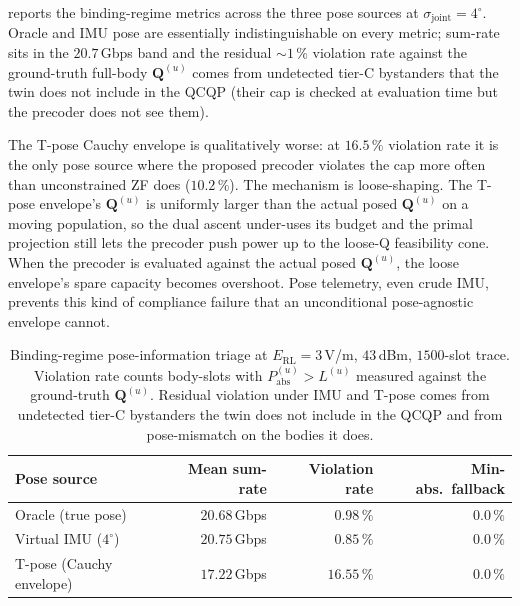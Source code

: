 \documentclass[journal,twocolumn,10pt]{IEEEtran}
\theoremstyle{plain}
\theoremstyle{remark}
\newcommand{\Pabs}{P_{\mathrm{abs}}}
\newcommand{\Qmat}{\mathbf{Q}}
\begin{document}
 reports the binding-regime metrics across the
three pose sources at $\sigma_{\mathrm{joint}} = 4^\circ$. Oracle
and IMU pose are essentially indistinguishable on every metric;
sum-rate sits in the $20.7\,$Gbps band and the residual
$\sim 1\,\%$ violation rate against the ground-truth full-body
$\Qmat^{(u)}$ comes from undetected tier-C bystanders that the
twin does not include in the QCQP (their cap is checked at
evaluation time but the precoder does not see them).

The T-pose Cauchy envelope is qualitatively worse: at
$16.5\,\%$ violation rate it is the only pose source where the
proposed precoder violates the cap more often than unconstrained
ZF does ($10.2\,\%$). The mechanism is loose-shaping. The T-pose
envelope's $\Qmat^{(u)}$ is uniformly larger than the actual posed
$\Qmat^{(u)}$ on a moving population, so the dual ascent under-uses
its budget and the primal projection still lets the precoder push
power up to the loose-Q feasibility cone. When the precoder is
evaluated against the actual posed $\Qmat^{(u)}$, the loose
envelope's spare capacity becomes overshoot. Pose telemetry, even
crude IMU, prevents this kind of compliance failure that an
unconditional pose-agnostic envelope cannot.

\begin{table}[!t]
\caption{Binding-regime pose-information triage at
$E_{\mathrm{RL}} = 3\,$V/m, $43\,$dBm, $1500$-slot trace. Violation
rate counts body-slots with $\Pabs^{(u)} > L^{(u)}$ measured against
the ground-truth $\Qmat^{(u)}$. Residual violation under IMU and
T-pose comes from undetected tier-C bystanders the twin does not
include in the QCQP and from pose-mismatch on the bodies it does.}
\label{tab:pose-triage}
\centering
\small
\begin{tabular}{@{}lrrr@{}}
\toprule
Pose source & Mean sum-rate & Violation rate & Min-abs.\ fallback \\
\midrule
Oracle (true pose) & $20.68\,$Gbps & $0.98\,\%$ & $0.0\,\%$ \\
Virtual IMU ($4^\circ$) & $20.75\,$Gbps & $0.85\,\%$ & $0.0\,\%$ \\
T-pose (Cauchy envelope) & $17.22\,$Gbps & $16.55\,\%$ & $0.0\,\%$ \\
\bottomrule
\end{tabular}
\end{table}
\end{document}
